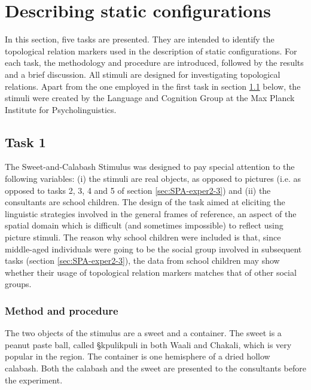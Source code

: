 \section{Describing static configurations}
\label{sec:SPA-topo-rel}

In this section, five tasks are presented. They are intended to identify
the topological relation markers  used in  the description of static
configurations. For each task, the methodology and procedure are introduced,
 followed by the results and a brief discussion.
All stimuli  are designed  for investigating topological
relations.  Apart from the one employed in the first task in
section
\ref{sec:SPA-exper1} below,
 the stimuli were  created  by the Language and Cognition Group at the Max
Planck Institute for Psycholinguistics. 


\subsection{Task 1}
\label{sec:SPA-exper1}  


The Sweet-and-Calabash Stimulus  was
designed to pay special attention to the following
variables: (i) the stimuli are real objects, as opposed to pictures (i.e. as
opposed to tasks  2, 3, 4 and 5 of section   \ref{sec:SPA-exper2-3})
and  (ii)  the consultants are school children. The design of the task aimed at
eliciting the linguistic strategies involved
in the general frames of reference, 
 an aspect of the spatial domain which is  difficult (and sometimes
impossible) to
reflect
using picture stimuli.  The reason why school children were
included is that,  since middle-aged  individuals were
going to be the social group involved in subsequent  tasks 
(section \ref{sec:SPA-exper2-3}), the data from
school children may
show  whether their usage of  topological relation markers matches that of 
other social groups.




\subsubsection{Method and procedure}
\label{sec:SPA-exper1-method}

The two objects of the stimulus are a sweet and a container. The sweet is a
peanut paste ball, called {\S kpulikpuli} in both Waali and Chakali, which is
very popular in the region. The container is one hemisphere of a dried hollow
calabash. Both the calabash and the sweet are presented to the consultants
before the experiment. 

